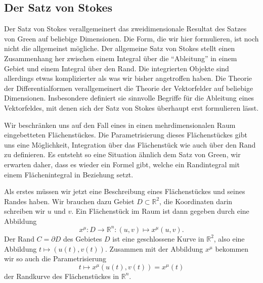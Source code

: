 \subsection{Der Satz von Stokes%
\label{skript:kruemmung:section:stokes}}
Der Satz von Stokes verallgemeinert das zweidimensionale Resultat des
Satzes von Green auf beliebige Dimensionen.
Die Form, die wir hier formulieren, ist noch nicht die allgemeinst
mögliche.
Der allgemeine Satz von Stokes stellt einen Zusammenhang her zwischen
einem Integral über die ``Ableitung'' in einem Gebiet und einem
Integral über den Rand.
Die integrierten Objekte sind allerdings etwas komplizierter als was
wir bisher angetroffen haben.
Die Theorie der Differentialformen verallgemeinert die Theorie der
Vektorfelder auf beliebige Dimensionen.
Insbesondere definiert sie sinnvolle Begriffe für die Ableitung eines
Vektorfeldes, mit denen sich der Satz von Stokes überhaupt erst formulieren
lässt.

Wir beschränken uns auf den Fall eines in einen mehrdimensionalen Raum
eingebetteten Flächen\-stückes.
Die Parametrisierung dieses Flächenstückes gibt uns eine Möglichkeit,
Integration über das Flächen\-stück wie auch über den Rand zu definieren.
Es entsteht so eine Situation ähnlich dem Satz von Green, wir erwarten
daher, dass es wieder ein Formel gibt, welche ein Randintegral mit einem
Flächenintegral in Beziehung setzt.


Als erstes müssen wir jetzt eine Beschreibung eines Flächenstückes
und seines Randes haben.
Wir brauchen dazu Gebiet $D\subset\mathbb R^2$, die Koordinaten darin
schreiben wir $u$ und $v$.
Ein Flächenstück im Raum ist dann gegeben durch eine Abbildung
\[
x^\mu\colon D\to \mathbb R^n\colon (u,v)\mapsto x^\mu(u,v).
\]
Der Rand $C=\partial D$ des Gebietes $D$ ist eine geschlossene Kurve
in $\mathbb R^2$, also eine Abbildung $t\mapsto (u(t),v(t))$.
Zusammen mit der Abbildung $x^\mu$ bekommen wir so auch die Parametrisierung
\[
t\mapsto x^\mu(u(t),v(t)) = x^\mu(t)
\]
der Randkurve des Flächenstückes in $\mathbb R^n$.

